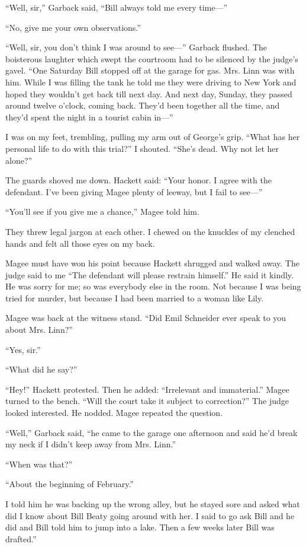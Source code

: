 \documentclass{novel}
\begin{document}
“Well, sir,” Garback said, “Bill always told me every time—”

“No, give me your own observations.”

“Well, sir, you don’t think I was around to see—” Garback flushed. The boisterous laughter which swept the courtroom had to be silenced by the judge’s gavel. “One Saturday Bill stopped off at the garage for gas. Mrs. Linn was with him. While I was filling the tank he told me they were driving to New York and hoped they wouldn’t get back till next day. And next day, Sunday, they passed around twelve o’clock, coming back. They’d been together all the time, and they’d spent the night in a tourist cabin in—”

I was on my feet, trembling, pulling my arm out of George’s grip. “What has her personal life to do with this trial?” I shouted. “She’s dead. Why not let her alone?”

The guards shoved me down. Hackett said: “Your honor. I agree with the defendant. I’ve been giving Magee plenty of leeway, but I fail to see—”

“You’ll see if you give me a chance,” Magee told him.

They threw legal jargon at each other. I chewed on the knuckles of my clenched hands and felt all those eyes on my back.

\scenestars

Magee must have won his point because Hackett shrugged and walked away. The judge said to me “The defendant will please restrain himself.” He said it kindly. He was sorry for me; so was everybody else in the room. Not because I was being tried for murder, but because I had been married to a woman like Lily.

Magee was back at the witness stand. “Did Emil Schneider ever speak to you about Mrs. Linn?”

“Yes, sir.”

“What did he say?”

“Hey!” Hackett protested. Then he added: “Irrelevant and immaterial.” Magee turned to the bench. “Will the court take it subject to correction?” The judge looked interested. He nodded. Magee repeated the question.

“Well,” Garback said, “he came to the garage one afternoon and said he’d break my neck if I didn’t keep away from Mrs. Linn.”

“When was that?”

“About the beginning of February.”

I told him he was backing up the wrong alley, but he stayed sore and asked what did I know about Bill Beaty going around with her. I said to go ask Bill and he did and Bill told him to jump into a lake. Then a few weeks later Bill was drafted.”
\end{document}

